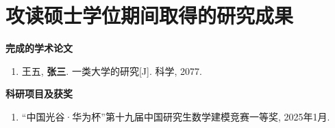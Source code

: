 \chapter{攻读硕士学位期间取得的研究成果}

\renewcommand{\labelenumi}{[\theenumi]}

{\noindent\textbf{完成的学术论文}}
\begin{enumerate}\setlength{\itemsep}{0pt}
\item 王五, \textbf{张三}. 一类大学的研究[J]. 科学, 2077.
\end{enumerate}

{\noindent\textbf{科研项目及获奖}}
\begin{enumerate}\setlength{\itemsep}{0pt}
\item “中国光谷·华为杯”第十九届中国研究生数学建模竞赛一等奖, 2025年1月.
\end{enumerate}
